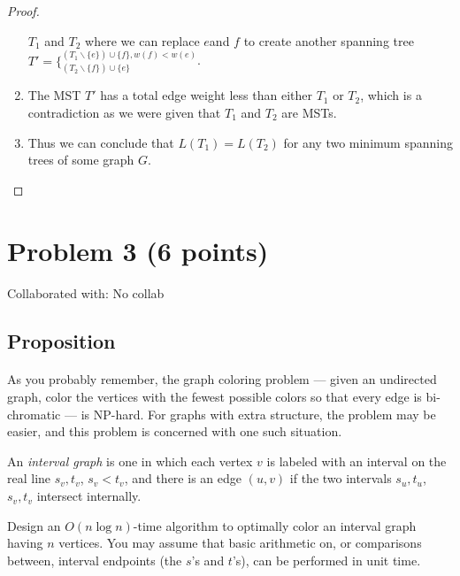 \documentclass{article}
\begin{document}
\begin{proof}
\begin{enumerate}
                  \(T_1\) and \(T_2\) where we can replace \(e\)and \(f\) to create
                  another spanning tree \(T' = \{^{(T_1 \backslash \{e\}) \cup \{f\}, w(f)
                              < w(e)}_{(T_2 \backslash \{f\}) \cup \{e\}} \).
            \item The MST \(T'\) has a total edge weight less than either \(T_1\) or
                  \(T_2\), which is a contradiction as we were given that \(T_1\) and
                  \(T_2\) are MSTs.
            \item Thus we can conclude that \(L(T_1) = L(T_2)\) for any two minimum
                  spanning trees of some graph \(G\).
      \end{enumerate}
\end{proof}

\newpage
\section{Problem 3 (6 points)}
Collaborated with: No collab

\subsection{Proposition}

\paragraph{}
As you probably remember, the graph coloring problem --- given an undirected graph, color
the vertices with the fewest possible colors so that every edge is bi-chromatic --- is
NP-hard. For graphs with extra structure, the problem may be easier, and this problem is
concerned with one such situation.

An \textit{interval graph} is one in which each vertex
\(v\) is labeled with an interval on the real line \(s_v, t_v\), \(s_v < t_v\), and there
is an edge \( (u,v) \) if the two intervals \(s_u, t_u\), \(s_v, t_v\) intersect
internally.

Design an \(O(n \log n)\)-time algorithm to optimally color an interval graph having \(n\)
vertices. You may assume that basic arithmetic on, or comparisons between, interval
endpoints (the \(s\)'s and \(t\)'s), can be performed in unit time.
\end{document}
